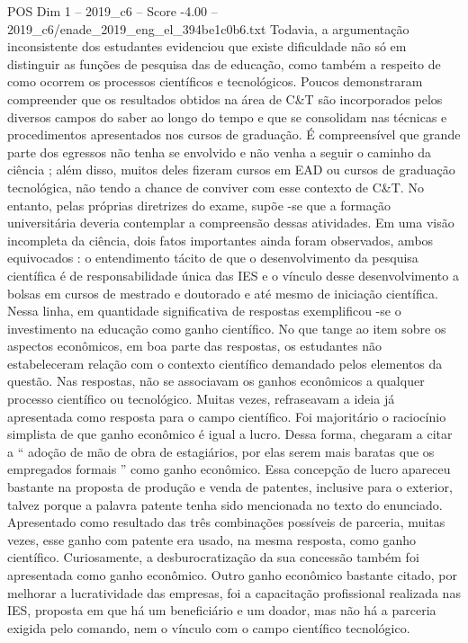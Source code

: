 \begin{textsample}{POS Dim 1 – 2019\_c6 – Score -4.00 – 2019\_c6/enade\_2019\_eng\_el\_394be1c0b6.txt}
Todavia, a argumentação inconsistente dos estudantes evidenciou que existe dificuldade não só em distinguir as funções de pesquisa das de educação, como também a respeito de como ocorrem os processos científicos e tecnológicos.
Poucos demonstraram compreender que os resultados obtidos na área de C\&T são incorporados pelos diversos campos do saber ao longo do tempo e que se consolidam nas técnicas e procedimentos apresentados nos cursos de graduação.
É compreensível que grande parte dos egressos não tenha se envolvido e não venha a seguir o caminho da ciência ; além disso, muitos deles fizeram cursos em EAD ou cursos de graduação tecnológica, não tendo a chance de conviver com esse contexto de C\&T.
No entanto, pelas próprias diretrizes do exame, supõe -se que a formação universitária deveria contemplar a compreensão dessas atividades.
Em uma visão incompleta da ciência, dois fatos importantes ainda foram observados, ambos equivocados : o entendimento tácito de que o desenvolvimento da pesquisa científica é de responsabilidade única das IES e o vínculo desse desenvolvimento a bolsas em cursos de mestrado e doutorado e até mesmo de iniciação científica.
Nessa linha, em quantidade significativa de respostas exemplificou -se o investimento na educação como ganho científico.
No que tange ao item sobre os aspectos econômicos, em boa parte das respostas, os estudantes não estabeleceram relação com o contexto científico demandado pelos elementos da questão.
Nas respostas, não se associavam os ganhos econômicos a qualquer processo científico ou tecnológico.
Muitas vezes, refraseavam a ideia já apresentada como resposta para o campo científico.
Foi majoritário o raciocínio simplista de que ganho econômico é igual a lucro.
Dessa forma, chegaram a citar a “ adoção de mão de obra de estagiários, por elas serem mais baratas que os empregados formais ” como ganho econômico.
Essa concepção de lucro apareceu bastante na proposta de produção e venda de patentes, inclusive para o exterior, talvez porque a palavra patente tenha sido mencionada no texto do enunciado.
Apresentado como resultado das três combinações possíveis de parceria, muitas vezes, esse ganho com patente era usado, na mesma resposta, como ganho científico.
Curiosamente, a desburocratização da sua concessão também foi apresentada como ganho econômico.
Outro ganho econômico bastante citado, por melhorar a lucratividade das empresas, foi a capacitação profissional realizada nas IES, proposta em que há um beneficiário e um doador, mas não há a parceria exigida pelo comando, nem o vínculo com o campo científico tecnológico.

\end{textsample}

